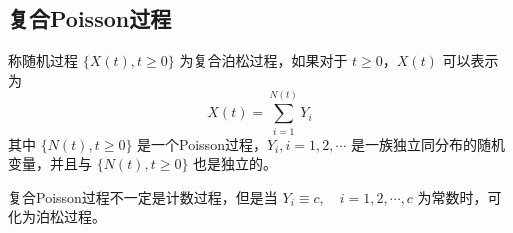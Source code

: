 \documentclass[lang=cn,10pt,thmcnt=section]{elegantbook}
\begin{document}
\subsection{复合Poisson过程}
\begin{definition}[复合Poisson过程]
	称随机过程 $\{X(t), t \geq 0\}$ 为复合泊松过程，如果对于 $t \geq 0$，$X(t)$ 可以表示为
\[
X(t) = \sum_{i=1}^{N(t)} Y_i
\]
其中 $\{N(t), t \geq 0\}$ 是一个Poisson过程，$Y_i, i = 1, 2, \cdots$ 是一族独立同分布的随机变量，并且与 $\{N(t), t \geq 0\}$ 也是独立的。
\end{definition}

\begin{remark}
	复合Poisson过程不一定是计数过程，但是当 $Y_i \equiv c, \quad i = 1, 2, \cdots, c$ 为常数时，可化为泊松过程。
\end{remark}
\end{document}
